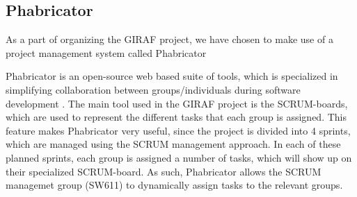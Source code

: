 \subsection{Phabricator}
As a part of organizing the GIRAF project, we have chosen to make use of a
project management system called Phabricator\nl

Phabricator is an open-source web based suite of tools, which is specialized in
simplifying collaboration between groups/individuals during software development
\cite{phabricator}. The main tool used in the GIRAF project is the SCRUM-boards,
which are used to represent the different tasks that each group is assigned.
This feature makes Phabricator very useful, since the project is divided into 4
sprints, which are managed using the SCRUM management approach.
In each of these planned sprints, each group is assigned a number of tasks,
which will show up on their specialized SCRUM-board. As such, Phabricator allows
the SCRUM managemet group (SW611) to dynamically assign tasks to the relevant
groups.